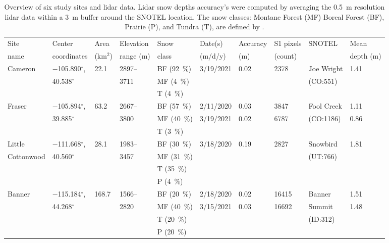 \documentclass[journal abbreviation, manuscript]{copernicus}
\begin{document}
\begin{table}[t]
\caption{Overview of six study sites and lidar data. Lidar snow depths accuracy's were computed by averaging the 0.5~m resolution lidar data within a 3~m buffer around the SNOTEL location. The snow classes: Montane Forest (MF) Boreal Forest (BF), Prairie (P), and Tundra (T), are defined by \cite{Sturm.2021}.}
\label{table:datasets}
\begin{tabular}{llllllllll} 
\hline
Site     & Center              & Area      & Elevation & Snow & Date(s) & Accuracy & S1 pixels & SNOTEL & Mean \\ 
name     & coordinates         & (km$^{2}$) & range (m) & class & (m/d/y)  & (m)    & (count) &         & depth (m) \\ \hline

Cameron & $-$105.890$^{\circ}$, & 22.1    & 2897-- & BF (92~\%) & 3/19/2021 & 0.02 & 2378 & Joe Wright & 1.41\\
         & 40.538$^{\circ}$    &      & 3711    & MF (4~\%)  &           &       &      & (CO:551)        & \\
         &                     &      &         & T (4~\%)   &           &       &      &           & \\ \hline

Fraser   & $-$105.894$^{\circ}$, & 63.2 & 2667--  & BF (57~\%) & 2/11/2020 & 0.03 & 3847 & Fool Creek & 1.11 \\
         & 39.885$^{\circ}$     &       & 3800 & MF (40~\%) & 3/19/2021 & 0.02 & 6787 & (CO:1186)  & 0.86 \\
         &                      &       &      & T (3~\%)   &           &      &      &            & \\ \hline

Little     & $-$111.668$^{\circ}$, & 28.1 & 1983-- & BF (30~\%) & 3/18/2020 & 0.19 & 2827 & Snowbird & 1.81 \\
Cottonwood & 40.560$^{\circ}$     &      & 3457 & MF (31~\%) &           &      &      & (UT:766) &     \\
           &                      &      &      & T  (35~\%) &           &      &      &          &    \\
           &                      &      &      & P  (4~\%)  &           &      &      &          &    \\ \hline
           
Banner     & $-$115.184$^{\circ}$, & 168.7 & 1566-- & BF (20~\%) & 2/18/2020 & 0.02 & 16415 & Banner  & 1.51 \\
           & 44.268$^{\circ}$    &       & 2820 & MF (40~\%) & 3/15/2021 & 0.03  & 16692 & Summit  & 1.48 \\
           &                      &       &      & T  (20~\%) &           &      &        & (ID:312)&    \\
           &                      &       &      & P  (20~\%) &           &      &        &         &    \\ \hline


\end{tabular}
\end{table}
\end{document}
